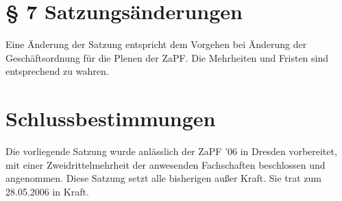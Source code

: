 \section*{§ 7 Satzungsänderungen}
Eine Änderung der Satzung entspricht dem Vorgehen bei Änderung der Geschäftsordnung für die Plenen der ZaPF.
Die Mehrheiten und Fristen sind entsprechend zu wahren.

\section*{Schlussbestimmungen}
Die vorliegende Satzung wurde anlässlich der ZaPF '06 in Dresden vorbereitet, mit einer Zweidrittelmehrheit der
anwesenden Fachschaften beschlossen und angenommen. Diese Satzung setzt alle bisherigen außer Kraft. Sie trat zum
28.05.2006 in Kraft.



